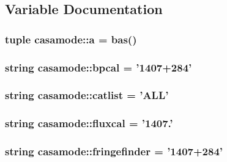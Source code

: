 \subsection{\-Variable \-Documentation}
\hypertarget{namespacecasamode_af8ef63e76629367e4608c45582024fb5}{
\subsubsection[{a}]{\setlength{\rightskip}{0pt plus 5cm}tuple {\bf casamode\-::a} = bas()}}\label{namespacecasamode_af8ef63e76629367e4608c45582024fb5}
\hypertarget{namespacecasamode_aa02b11b4029c791ae4409d257259fe66}{
\subsubsection[{bpcal}]{\setlength{\rightskip}{0pt plus 5cm}string {\bf casamode\-::bpcal} = '1407+284'}}\label{namespacecasamode_aa02b11b4029c791ae4409d257259fe66}
\hypertarget{namespacecasamode_a302834304f815a0efb70313a0a59f5bb}{
\subsubsection[{catlist}]{\setlength{\rightskip}{0pt plus 5cm}string {\bf casamode\-::catlist} = '\-A\-L\-L'}}\label{namespacecasamode_a302834304f815a0efb70313a0a59f5bb}
\hypertarget{namespacecasamode_af407f6ad8015416bde1e3a2d4cca9306}{
\subsubsection[{fluxcal}]{\setlength{\rightskip}{0pt plus 5cm}string {\bf casamode\-::fluxcal} = '1407.'}}\label{namespacecasamode_af407f6ad8015416bde1e3a2d4cca9306}
\hypertarget{namespacecasamode_a92dfbda1cee2c2f465ed8ce489e61994}{
\subsubsection[{fringefinder}]{\setlength{\rightskip}{0pt plus 5cm}string {\bf casamode\-::fringefinder} = '1407+284'}}\label{namespacecasamode_a92dfbda1cee2c2f465ed8ce489e61994}
